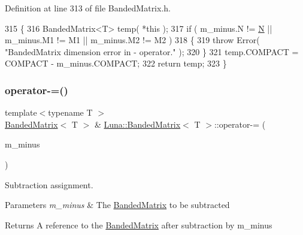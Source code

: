 Definition at line 313 of file Banded\+Matrix.\+h.


\begin{DoxyCode}
315   \{
316     BandedMatrix<T> temp( *\textcolor{keyword}{this} );
317     \textcolor{keywordflow}{if} ( m\_minus.N != \hyperlink{namespaceHeat__plot_a7d050092798e28458a263710837bda77}{N} || m\_minus.M1 != M1 || m\_minus.M2 != M2 )
318     \{
319       \textcolor{keywordflow}{throw} Error( \textcolor{stringliteral}{"BandedMatrix dimension error in - operator."} );
320     \}
321     temp.COMPACT = COMPACT - m\_minus.COMPACT;
322     \textcolor{keywordflow}{return} temp;
323   \}
\end{DoxyCode}
\mbox{\label{classLuna_1_1BandedMatrix_a4a38366bcdc1401fff6f70add2f01ae1}} 
\subsubsection{\texorpdfstring{operator-\/=()}{operator-=()}\hspace{0.1cm}{\footnotesize\ttfamily [1/2]}}
{\footnotesize\ttfamily template$<$typename T $>$ \\
\hyperlink{classLuna_1_1BandedMatrix}{Banded\+Matrix}$<$ T $>$ \& \hyperlink{classLuna_1_1BandedMatrix}{Luna\+::\+Banded\+Matrix}$<$ T $>$\+::operator-\/= (\begin{DoxyParamCaption}\item[{const \hyperlink{classLuna_1_1BandedMatrix}{Banded\+Matrix}$<$ T $>$ \&}]{m\+\_\+minus }\end{DoxyParamCaption})\hspace{0.3cm}{\ttfamily [inline]}}



Subtraction assignment. 


\begin{DoxyParams}{Parameters}
{\em m\+\_\+minus} & The \hyperlink{classLuna_1_1BandedMatrix}{Banded\+Matrix} to be subtracted \\
\hline
\end{DoxyParams}
\begin{DoxyReturn}{Returns}
A reference to the \hyperlink{classLuna_1_1BandedMatrix}{Banded\+Matrix} after subtraction by m\+\_\+minus 
\end{DoxyReturn}


